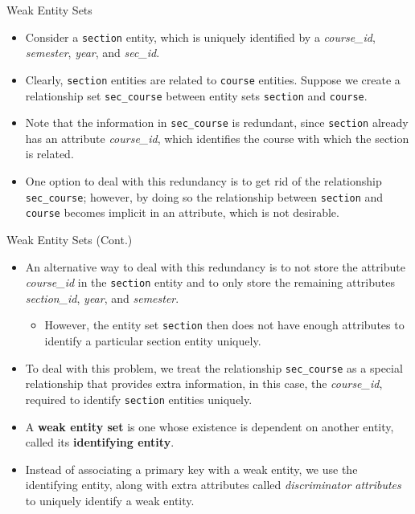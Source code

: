 \documentclass[aspectratio=169]{beamer}
\begin{document}
\begin{frame}{Weak Entity Sets}
    \begin{itemize}
        \item Consider a \texttt{section} entity, which is uniquely identified by a \textit{course\_id}, \textit{semester}, \textit{year}, and \textit{sec\_id}.
        \item Clearly, \texttt{section} entities are related to \texttt{course} entities. Suppose we create a relationship set \texttt{sec\_course} between entity sets \texttt{section} and \texttt{course}.
        \item Note that the information in \texttt{sec\_course} is redundant, since \texttt{section} already has an attribute \textit{course\_id}, which identifies the course with which the section is related.
        \item One option to deal with this redundancy is to get rid of the relationship \texttt{sec\_course}; however, by doing so the relationship between \texttt{section} and \texttt{course} becomes implicit in an attribute, which is not desirable.
    \end{itemize}
\end{frame}

\begin{frame}{Weak Entity Sets (Cont.)}
    \begin{itemize}
        \item An alternative way to deal with this redundancy is to not store the attribute \textit{course\_id} in the \texttt{section} entity and to only store the remaining attributes \textit{section\_id}, \textit{year}, and \textit{semester}.
        \begin{itemize}
            \item However, the entity set \texttt{section} then does not have enough attributes to identify a particular section entity uniquely.
        \end{itemize}
        \item To deal with this problem, we treat the relationship \texttt{sec\_course} as a special relationship that provides extra information, in this case, the \textit{course\_id}, required to identify \texttt{section} entities uniquely.
        \item A \textbf{weak entity set} is one whose existence is dependent on another entity, called its \textbf{identifying entity}.
        \item Instead of associating a primary key with a weak entity, we use the identifying entity, along with extra attributes called \textit{discriminator attributes} to uniquely identify a weak entity.
    \end{itemize}
\end{frame}
\end{document}
